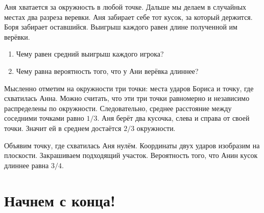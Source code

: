 \begin{problem}

Аня хватается за окружность в любой точке. Дальше мы делаем в случайных местах два разреза веревки. Аня забирает себе тот кусок, за который держится. Боря забирает оставшийся. Выигрыш каждого равен длине полученной им верёвки.
\begin{enumerate}
\item Чему равен средний выигрыш каждого игрока?
\item Чему равна вероятность того, что у Ани верёвка длиннее?
\end{enumerate}

\begin{sol}
\item Мысленно отметим на окружности три точки: места ударов Бориса и точку, где схватилась Анна. Можно считать, что эти три точки равномерно и независимо распределены по окружности. Следовательно, среднее расстояние между соседними точками равно $1/3$. Аня берёт два кусочка, слева и справа от своей точки. Значит ей в среднем достаётся $2/3$ окружности.
\item  Объявим точку, где схватилась Аня нулём. Координаты двух ударов изобразим на плоскости. Закрашиваем подходящий участок. Вероятность того, что Анин кусок длиннее равна $3/4$.
\end{sol}
\end{problem}



\section{Начнем с конца!}


